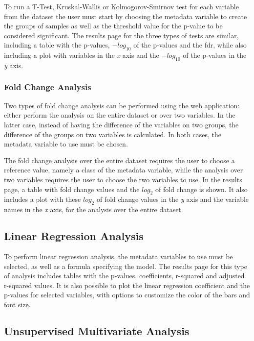 To run a T-Test, Kruskal-Wallis or Kolmogorov-Smirnov test for each variable from the dataset the user must start by choosing the metadata variable to create the groups of samples as well as the threshold value for the p-value to be considered significant. The results page for the three types of tests are similar, including a table with the p-values, $-log_{\text{10}}$ of the p-values and the \acrlong{fdr}, while also including a plot with variables in the \textit{x} axis and the $-log_{\text{10}}$ of the p-values in the \textit{y} axis.

\subsubsection{Fold Change Analysis}

Two types of fold change analysis can be performed using the web application: either perform the analysis on the entire dataset or over two variables. In the latter case, instead of having the difference of the variables on two groups, the difference of the groups on two variables is calculated. In both cases, the metadata variable to use must be chosen. 

The fold change analysis over the entire dataset requires the user to choose a reference value, namely a class of the metadata variable, while the analysis over two variables requires the user to choose the two variables to use. In the results page, a table with fold change values and the $log_{\text{2}}$ of fold change is shown. It also includes a plot with these $log_{\text{2}}$ of fold change values in the \textit{y} axis and the variable names in the \textit{x} axis, for the analysis over the entire dataset.


\subsection{Linear Regression Analysis}

To perform linear regression analysis, the metadata variables to use must be selected, as well as a formula specifying the model. The results page for this type of analysis includes tables with the p-values, coefficients, r-squared and adjusted r-squared values. It is also possible to plot the linear regression coefficient and the p-values for selected variables, with options to customize the color of the bars and font size.



\subsection{Unsupervised Multivariate Analysis}

